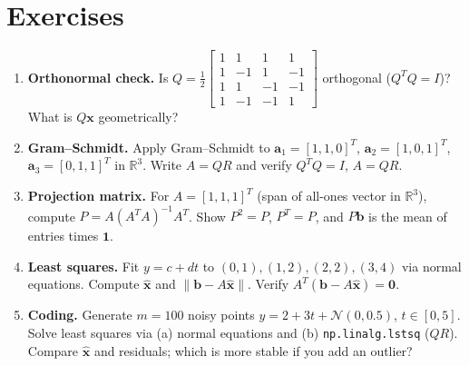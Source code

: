 \section{Exercises}
\label{sec:ch06-exercises}
\begin{enumerate}[label=E6.\arabic*, leftmargin=*, itemsep=0.8em]
\item \textbf{Orthonormal check.} Is $Q=\frac12\begin{bmatrix}1&1&1&1\\1&-1&1&-1\\1&1&-1&-1\\1&-1&-1&1\end{bmatrix}$ orthogonal ($Q^TQ=I$)? What is $Q\mathbf{x}$ geometrically?
\item \textbf{Gram--Schmidt.} Apply Gram--Schmidt to $\mathbf{a}_1=[1,1,0]^T$, $\mathbf{a}_2=[1,0,1]^T$, $\mathbf{a}_3=[0,1,1]^T$ in $\mathbb{R}^3$. Write $A=QR$ and verify $Q^TQ=I$, $A=QR$.
\item \textbf{Projection matrix.} For $A=[1,1,1]^T$ (span of all-ones vector in $\mathbb{R}^3$), compute $P=A(A^TA)^{-1}A^T$. Show $P^2=P$, $P^T=P$, and $P\mathbf{b}$ is the mean of entries times $\mathbf{1}$.
\item \textbf{Least squares.} Fit $y=c+dt$ to $(0,1),(1,2),(2,2),(3,4)$ via normal equations. Compute $\hat{\mathbf{x}}$ and $\|\mathbf{b}-A\hat{\mathbf{x}}\|$. Verify $A^T(\mathbf{b}-A\hat{\mathbf{x}})=\mathbf{0}$.
\item \textbf{Coding.} Generate $m=100$ noisy points $y=2+3t+\mathcal{N}(0,0.5)$, $t\in[0,5]$. Solve least squares via (a) normal equations and (b) \texttt{np.linalg.lstsq} ($QR$). Compare $\hat{\mathbf{x}}$ and residuals; which is more stable if you add an outlier?
\end{enumerate}

